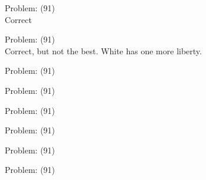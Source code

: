 \documentclass[11pt]{article}
\begin{document}
\begin{minipage}[t]{0.5\textwidth}
  {\centering
  
  Problem: (91)\\
  Correct\\
  }
\end{minipage}
\begin{minipage}[t]{0.5\textwidth}
  {\centering
  
  Problem: (91)\\
  Correct, but not the best. White has one more liberty.\\
  }
\end{minipage}
\begin{minipage}[t]{0.5\textwidth}
  {\centering
  
  Problem: (91)\\
  
  }
\end{minipage}
\begin{minipage}[t]{0.5\textwidth}
  {\centering
  
  Problem: (91)\\
  
  }
\end{minipage}
\begin{minipage}[t]{0.5\textwidth}
  {\centering
  
  Problem: (91)\\
  
  }
\end{minipage}
\begin{minipage}[t]{0.5\textwidth}
  {\centering
  
  Problem: (91)\\
  
  }
\end{minipage}
\begin{minipage}[t]{0.5\textwidth}
  {\centering
  
  Problem: (91)\\
  
  }
\end{minipage}
\begin{minipage}[t]{0.5\textwidth}
  {\centering
  
  Problem: (91)\\
  
  }
\end{minipage}
\end{document}
